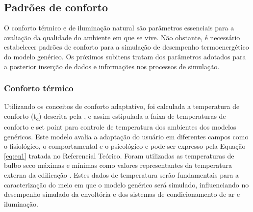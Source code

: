 \subsection{Padrões de conforto}
O conforto térmico e de iluminação natural são parâmetros essenciais para a avaliação 
da qualidade do ambiente em que se vive. Não obstante, é necessário estabelecer padrões 
de conforto para a simulação de desempenho termoenergético do modelo genérico. Os 
próximos subitens tratam dos parâmetros adotados para a posterior inserção de dados 
e informações nos processos de simulação.
\subsubsection{Conforto térmico}
Utilizando os conceitos de conforto adaptativo, foi calculada a temperatura de conforto (t\textsubscript{c}) 
descrita pela \textcite{AmericanSocietyofHeatingRefrigeratingandAir-ConditioningEngineers-ASHRAE2017}, e assim estipulada a faixa de temperaturas de conforto e 
set point para controle de temperatura dos ambientes dos modelos genéricos. Este modelo 
avalia a adaptação do usuário em diferentes campos como o fisiológico, o comportamental 
e o psicológico \cite{AmericanSocietyofHeatingRefrigeratingandAir-ConditioningEngineers-ASHRAE2017a} e pode ser expresso pela Equação \ref{eq:eq1} tratada no Referencial Teórico.\vspace*{0.3cm} \newline
Foram utilizadas as temperaturas de bulbo seco máximas e mínimas como valores representantes 
da temperatura externa da edificação \cite{InstitutoNacionaldeMetereologia-INMET2018}. Estes dados de temperatura serão 
fundamentais para a caracterização do meio em que o modelo genérico será simulado, 
influenciando no desempenho simulado da envoltória e dos sistemas de condicionamento de ar 
e iluminação.
